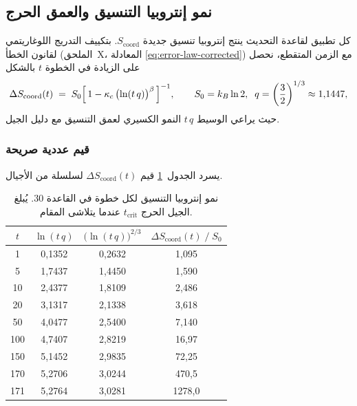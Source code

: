 \documentclass[12pt,a4paper]{article}
\begin{document}
	\subsection{نمو إنتروبيا التنسيق والعمق الحرج}
	\label{subsec:entropy-growth}
	
	كل تطبيق لقاعدة التحديث ينتج إنتروبيا تنسيق جديدة \(S_{\mathrm{coord}}\). بتكييف التدريج اللوغاريتمي لقانون الخطأ (الملحق~X، المعادلة \eqref{eq:error-law-corrected}) مع الزمن المتقطع، نحصل على الزيادة في الخطوة \(t\) بالشكل
	\begin{equation}
		\Delta S_{\mathrm{coord}}(t) \;=\;
		S_{0}\Bigl[\,1 - \kappa_c\,\bigl(\ln(t\,q)\bigr)^{\beta}\,\Bigr]^{-1},
		\qquad
		S_{0}=k_{B}\ln 2,\;\;
		q = \left(\frac{3}{2}\right)^{1/3}\approx 1{,}1447,
		\label{eq:deltaS}
	\end{equation}
	حيث يراعي الوسيط \(t\,q\) النمو الكسيري لعمق التنسيق مع دليل الجيل.
	
	\subsubsection*{قيم عددية صريحة}
	يسرد الجدول~\ref{tab:entropy} قيم \(\Delta S_{\mathrm{coord}}(t)\) لسلسلة من الأجيال.
	
	\begin{table}[H]
		\centering
		\caption{نمو إنتروبيا التنسيق لكل خطوة في القاعدة 30. يُبلغ الجيل الحرج \(t_{\mathrm{crit}}\) عندما يتلاشى المقام.}
		\label{tab:entropy}
		\small
		\begin{tabular}{c c c c}
			\toprule
			\(t\) & \(\ln(t\,q)\) & \(\bigl(\ln(t\,q)\bigr)^{2/3}\) &
			\(\Delta S_{\mathrm{coord}}(t)\;/\;S_{0}\) \\
			\midrule
			1    & 0{,}1352 & 0{,}2632 & 1{,}095  \\
			5    & 1{,}7437 & 1{,}4450 & 1{,}590  \\
			10   & 2{,}4377 & 1{,}8109 & 2{,}486  \\
			20   & 3{,}1317 & 2{,}1338 & 3{,}618  \\
			50   & 4{,}0477 & 2{,}5400 & 7{,}140  \\
			100  & 4{,}7407 & 2{,}8219 & 16{,}97  \\
			150  & 5{,}1452 & 2{,}9835 & 72{,}25  \\
			170  & 5{,}2706 & 3{,}0244 & 470{,}5  \\
			171  & 5{,}2764 & 3{,}0281 & 1278{,}0 \\
			\bottomrule
		\end{tabular}
	\end{table}
	
\end{document}

